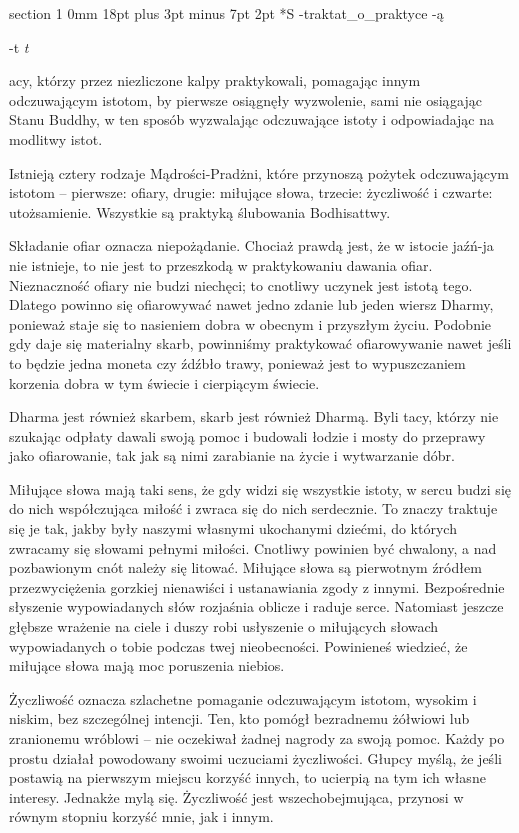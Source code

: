 \documentclass[12pt]{article}
\makeatletter
\renewcommand{\section}{\@startsection%
 {section}			%
 {1}				%
 {0mm}				%
 {18pt plus 3pt minus 7pt}	%
 { 2pt}				%
 {\bfseries}}			%
\newcounter{labelnum}
\newenvironment{Prayer}[4]{%
	\section*{#2}
	\ifx -#1
		\stepcounter{labelnum}\label{label.\arabic{labelnum}}\nopagebreak
	\else
		\label{#1}\nopagebreak
	\fi
	\ifx -#3
		\addcontentsline{toc}{section}{#2}
	\else
		\addcontentsline{toc}{section}{#3}
	\fi
	\ifx -#4
		{}
	\else
		\noindent\emph{#4}\par\nopagebreak
	\fi
	\begingroup
}
{\par\endgroup}
\makeatother
\begin{document}
\begin{Prayer}{traktat_o_praktyce}
Są tacy, którzy przez niezliczone kalpy praktykowali, pomagając innym odczuwającym istotom, by pierwsze osiągnęły wyzwolenie, sami nie osiągając Stanu Buddhy, w ten sposób wyzwalając odczuwające istoty i odpowiadając na modlitwy istot. 


Istnieją cztery rodzaje Mądrości-Pradżni, które przynoszą pożytek odczuwającym istotom -- pierwsze: ofiary, drugie: miłujące słowa, trzecie: życzliwość i czwarte: utożsamienie. Wszystkie są praktyką ślubowania Bodhisattwy. 


Składanie ofiar oznacza niepożądanie. Chociaż prawdą jest, że w istocie jaźń-ja nie istnieje, to nie jest to przeszkodą  w praktykowaniu dawania ofiar. Nieznaczność ofiary nie budzi niechęci; to cnotliwy uczynek jest istotą tego. Dlatego powinno się ofiarowywać nawet jedno zdanie lub jeden wiersz Dharmy, ponieważ staje się to nasieniem dobra w obecnym i przyszłym życiu. Podobnie gdy daje się materialny skarb, powinniśmy praktykować ofiarowywanie nawet jeśli to będzie jedna moneta czy źdźbło trawy,  ponieważ jest to wypuszczaniem korzenia dobra w tym świecie i cierpiącym świecie.


Dharma jest również skarbem, skarb jest również Dharmą. Byli tacy, którzy nie szukając odpłaty dawali swoją pomoc i budowali łodzie i mosty do przeprawy jako ofiarowanie, tak jak są nimi zarabianie na życie i wytwarzanie dóbr.


Miłujące słowa mają taki sens, że gdy widzi się wszystkie istoty, w sercu budzi się do nich współczująca miłość i zwraca się do nich serdecznie. To znaczy traktuje się je tak, jakby były naszymi własnymi ukochanymi dziećmi, do których zwracamy się słowami pełnymi miłości. Cnotliwy powinien być chwalony, a nad pozbawionym cnót należy się litować. Miłujące słowa są pierwotnym źródłem przezwyciężenia gorzkiej nienawiści i ustanawiania zgody z innymi. Bezpośrednie słyszenie wypowiadanych słów rozjaśnia oblicze i raduje serce. Natomiast jeszcze głębsze wrażenie na ciele i duszy robi usłyszenie o miłujących słowach wypowiadanych o tobie podczas twej nieobecności. Powinieneś wiedzieć, że miłujące słowa mają moc poruszenia niebios.


Życzliwość oznacza szlachetne pomaganie odczuwającym istotom, wysokim i niskim, bez szczególnej intencji. Ten, kto pomógł bezradnemu żółwiowi lub zranionemu wróblowi -- nie oczekiwał żadnej nagrody za swoją pomoc. Każdy po prostu działał powodowany swoimi uczuciami życzliwości. Głupcy myślą, że jeśli postawią na pierwszym miejscu korzyść innych, to ucierpią na tym ich własne interesy. Jednakże mylą się. Życzliwość jest wszechobejmująca, przynosi w równym stopniu korzyść mnie, jak i innym.



\end{Prayer}
\end{document}

